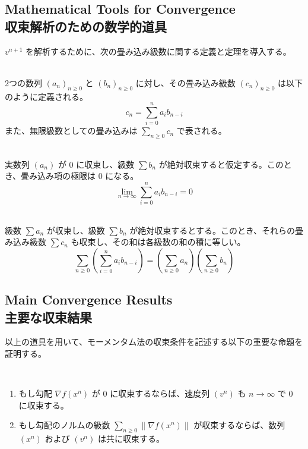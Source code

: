 \documentclass[dvipdfmx,a4paper,11pt]{jsarticle}
\begin{document}
\subsection{Mathematical Tools for Convergence\\ 収束解析のための数学的道具}

$v^{n+1}$ を解析するために、次の畳み込み級数に関する定義と定理を導入する。

\begin{dfn}\label{dfn:convolution_series}\ \\
    2つの数列 $(a_n)_{n \geq 0}$ と $(b_n)_{n \geq 0}$ に対し、その畳み込み級数 $(c_n)_{n \geq 0}$ は以下のように定義される。
    \[
    c_n = \sum_{i=0}^{n} a_i b_{n-i}
    \]
    また、無限級数としての畳み込みは $\sum_{n \geq 0} c_n$ で表される。
\end{dfn}

\begin{prop}\footnotemark[5]\label{prop:limit}\ \\
    実数列 $(a_n)$ が $0$ に収束し、級数 $\sum b_n$ が絶対収束すると仮定する。このとき、畳み込み項の極限は $0$ になる。
    \[
    \lim_{n \to \infty} \sum_{i=0}^{n} a_i b_{n-i} = 0
    \]
\end{prop}
\begin{thm}\footnotemark[6]\label{thm:convergence}\ \\
    級数 $\sum a_n$ が収束し、級数 $\sum b_n$ が絶対収束するとする。このとき、それらの畳み込み級数 $\sum c_n$ も収束し、その和は各級数の和の積に等しい。
    \[
    \sum_{n \ge 0} \left( \sum_{i=0}^{n} a_i b_{n-i} \right) = \left( \sum_{n \ge 0} a_n \right) \left( \sum_{n \ge 0} b_n \right)
    \]
\end{thm}
\subsection{Main Convergence Results\\ 主要な収束結果}

以上の道具を用いて、モーメンタム法の収束条件を記述する以下の重要な命題を証明する。

\begin{prop}\ \\
    \begin{enumerate}[label=(\alph*)]
        \item もし勾配 $\nabla f(x^n)$ が $0$ に収束するならば、速度列 $(v^n)$ も $n \to \infty$ で $0$ に収束する。
        \item もし勾配のノルムの級数 $\sum_{n \ge 0} \|\nabla f(x^n)\|$ が収束するならば、数列 $(x^n)$ および $(v^n)$ は共に収束する。
    \end{enumerate}
\end{prop}
\end{document}

